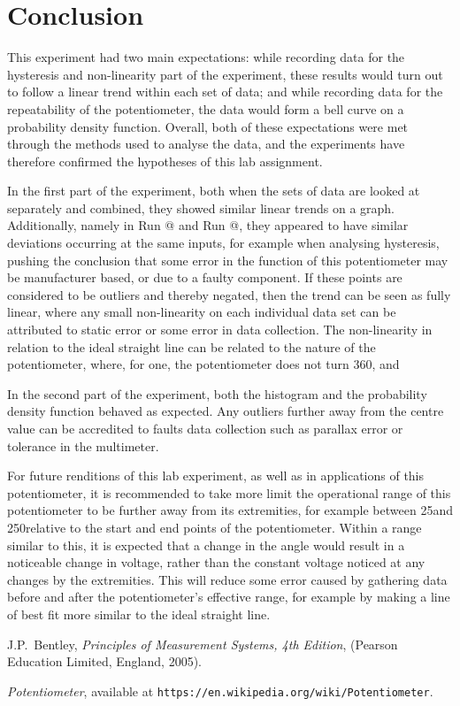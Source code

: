 \documentclass[a4,11pt]{article}
\makeatletter
\newcommand*{\rom}[1]{\expandafter\@slowromancap\romannumeral #1@}
\makeatother
\begin{document}
\section{Conclusion}
 This experiment had two main expectations: while recording data for the hysteresis and non-linearity part of the experiment, these results would turn out to follow a linear trend within each set of data; and while recording data for the repeatability of the potentiometer, the data would form a bell curve on a probability density function. Overall, both of these expectations were met through the methods used to analyse the data, and the experiments have therefore confirmed the hypotheses of this lab assignment.
 
 In the first part of the experiment, both when the sets of data are looked at separately and combined, they showed similar linear trends on a graph. Additionally, namely in Run \rom{1} and Run \rom{2}, they appeared to have similar deviations occurring at the same inputs, for example when analysing hysteresis, pushing the conclusion that some error in the function of this potentiometer may be manufacturer based, or due to a faulty component. If these points are considered to be outliers and thereby negated, then the trend can be seen as fully linear, where any small non-linearity on each individual data set can be attributed to static error or some error in data collection. The non-linearity in relation to the ideal straight line can be related to the nature of the potentiometer, where, for one, the potentiometer does not turn 360\degree, and 
 
 In the second part of the experiment, both the histogram and the probability density function behaved as expected. Any outliers further away from the centre value can be accredited to faults data collection such as parallax error or tolerance in the multimeter.

For future renditions of this lab experiment, as well as in applications of this potentiometer, it is recommended to take more limit the operational range of this potentiometer to be further away from its extremities, for example between 25\degree and 250\degree relative to the start and end points of the potentiometer. Within a range similar to this, it is expected that a change in the angle would result in a noticeable change in voltage, rather than the constant voltage noticed at any changes by the extremities. This will reduce some error caused by gathering data before and after the potentiometer's effective range, for example by making a line of best fit more similar to the ideal straight line.
\onecolumn
\begin{thebibliography}{99}
	
	J.P.\ Bentley, \textit{Principles of Measurement Systems, 4th Edition},
	(Pearson Education Limited, England, 2005).
	
	 \emph{Potentiometer},   available at
	\texttt{https://en.wikipedia.org/wiki/Potentiometer}.
	
\end{thebibliography}
\appendix
\end{document}
